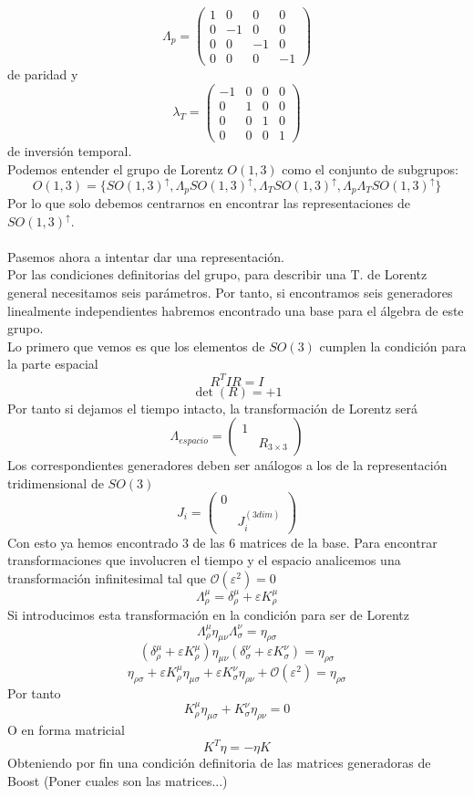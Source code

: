 \documentclass[12pt]{article}
\begin{document}
$$\Lambda_p=\begin{pmatrix}
	1 & 0 & 0 &0 \\ 0 &-1 &0 &0 \\ 0 & 0 & -1 & 0 \\ 0 & 0 & 0& -1
\end{pmatrix}$$
de paridad  y
$$\lambda_T=\begin{pmatrix}
	-1 & 0 & 0 &0 \\ 0 &1 &0 &0 \\ 0 & 0 & 1 & 0 \\ 0 & 0 & 0& 1
\end{pmatrix}$$
de inversión temporal.\\
Podemos entender el grupo de Lorentz $O(1,3)$ como el conjunto de subgrupos:
$$O(1,3)=\{SO(1,3)^\uparrow,\Lambda_pSO(1,3)^\uparrow,\Lambda_TSO(1,3)^\uparrow,\Lambda_p\Lambda_TSO(1,3)^\uparrow\}$$
Por lo que solo debemos centrarnos en encontrar las representaciones de $SO(1,3)^\uparrow$.\\\\
Pasemos ahora a intentar dar una representación.\\
Por las condiciones definitorias del grupo, para describir una T. de Lorentz general necesitamos seis parámetros. Por tanto, si encontramos seis generadores linealmente independientes habremos encontrado una base para el álgebra de este grupo.\\
Lo primero que vemos es que los elementos de $SO(3)$ cumplen la condición para la parte espacial
$$R^T I R=I$$
$$\det(R)=+1$$
Por tanto si dejamos el tiempo intacto, la transformación de Lorentz será
$$\Lambda_{espacio}=\begin{pmatrix}
	1 & \\ & R_{3\times 3}
\end{pmatrix}$$
Los correspondientes generadores deben ser análogos a los de la representación tridimensional de $SO(3)$
$$J_i=\begin{pmatrix}
	0 & \\ & J_i^{(3 dim)}
\end{pmatrix}$$
Con esto ya hemos encontrado $3$ de las $6$ matrices de la base. Para encontrar transformaciones que involucren el tiempo y el espacio analicemos una transformación infinitesimal tal que $\mathcal{O}(\varepsilon^2)=0$
$$\Lambda^\mu_\rho=\delta^\mu_\rho+\varepsilon K^\mu_\rho$$
Si introducimos esta transformación en la condición para ser de Lorentz
$$\Lambda^\mu_\rho\eta_{\mu \nu}\Lambda^\nu_\sigma=\eta_{\rho \sigma}$$
$$(\delta^\mu_\rho+\varepsilon K^\mu_\rho)\eta_{\mu \nu}(\delta^\nu_\sigma+\varepsilon K^\nu_\sigma)=\eta_{\rho\sigma}$$
$$\eta_{\rho\sigma}+\varepsilon K^\mu_\rho\eta_{\mu \sigma}+\varepsilon K^\nu_\sigma \eta_{\rho \nu}
+ \mathcal{O}(\varepsilon^2)=\eta_{\rho\sigma}$$
Por tanto
$$K^\mu_\rho\eta_{\mu \sigma}+K^\nu_\sigma\eta_{\rho \nu}=0$$
O en forma matricial
$$K^T\eta=-\eta K$$
Obteniendo por fin una condición definitoria de las matrices generadoras de Boost
(Poner cuales son las matrices...)
\end{document}
